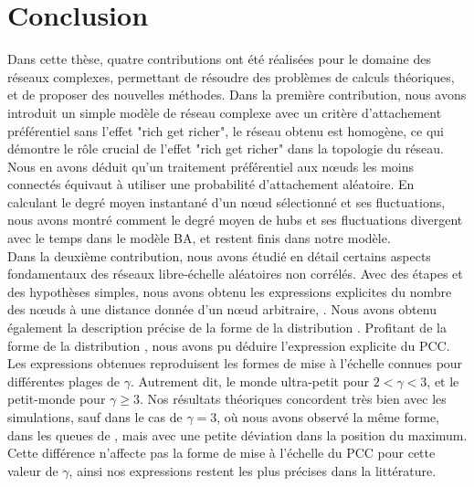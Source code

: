 %
\chapter*{Conclusion}
 


Dans cette thèse, quatre contributions ont été réalisées pour le domaine des réseaux complexes, permettant de résoudre des problèmes de calculs théoriques, et de proposer des nouvelles méthodes. Dans la première contribution, nous avons introduit un simple modèle de réseau complexe avec un critère d'attachement préférentiel sans l'effet "rich get richer", le réseau obtenu est homogène, ce qui démontre le rôle crucial de l'effet "rich get richer" dans la topologie du réseau. Nous en avons déduit qu'un traitement préférentiel aux nœuds les moins connectés équivaut à utiliser une probabilité d'attachement aléatoire. En calculant le degré moyen instantané d'un nœud sélectionné et ses fluctuations, nous avons montré comment le degré moyen de hubs et ses fluctuations divergent avec le temps dans le modèle BA, et restent finis dans notre modèle.\\

Dans la deuxième contribution, nous avons étudié en détail certains aspects fondamentaux des réseaux libre-échelle aléatoires non corrélés. Avec des étapes et des hypothèses simples, nous avons obtenu les expressions explicites du nombre des nœuds à une distance donnée d'un nœud arbitraire, \nl\nolinebreak. Nous avons obtenu également la description précise de la forme de la distribution \nolinebreak. Profitant de la forme de la distribution \nl, nous avons pu déduire l'expression explicite du PCC. Les expressions obtenues reproduisent les formes de mise à l'échelle connues pour différentes plages de $\gamma$. Autrement dit, le monde ultra-petit pour $2<\gamma<3$, et le petit-monde pour $\gamma\ge 3$. Nos résultats théoriques concordent très bien avec les simulations, sauf dans le cas de $\gamma=3$, où nous avons observé la même forme, dans les queues de \nl, mais avec une petite déviation dans la position du maximum. Cette différence n'affecte pas la forme de mise à l'échelle du PCC pour cette valeur de $\gamma$, ainsi nos expressions restent les plus précises dans la littérature.\\

